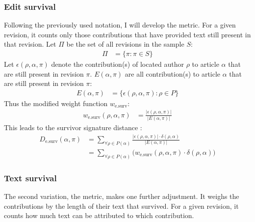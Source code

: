\subsubsection{Edit survival}

Following the previously used notation, I will develop the  metric.
For a given revision, it counts only those contributions that have provided text still present in that revision.
Let $\Pi$ be the set of all revisions in the sample $S$:
\begin{align*}
\Pi &= \{\pi : \pi \in S\}
\end{align*}
Let $\epsilon(\rho,\alpha,\pi)$ denote the contribution(s) of located author $\rho$ to article $\alpha$ that are still present in revision $\pi$.
$E(\alpha,\pi)$ are all contribution(s) to article $\alpha$ that are still present in revision $\pi$:
\begin{align*}
E(\alpha,\pi) &= \{\epsilon(\rho,\alpha,\pi) : \rho \in P\}
\end{align*}
Thus the modified weight function $w_{\text{e.surv}}$: 
\begin{align*}
w_{\text{e.surv}}(\rho,\alpha,\pi) &= \frac{|\epsilon(\rho,\alpha,\pi)|}{|E(\alpha,\pi)|}
\end{align*}
This leads to the survivor signature distance :
\begin{equation}\label{eqn:sigdistsurvival}
\begin{split}
D_{\text{e.surv}}(\alpha,\pi) & = \sum_{\forall \rho \in P(\alpha)} \frac{|\epsilon(\rho,\alpha,\pi)| \cdot \delta(\rho,\alpha)}{|E(\alpha,\pi)|} \\
 & =  \sum_{\forall \rho \in P(\alpha)} \big(w_{\text{e.surv}}(\rho,\alpha,\pi) \cdot \delta(\rho,\alpha)\big)
 \end{split}
\end{equation}
 

\subsubsection{Text survival}

The second variation, the  metric, makes one further adjustment.
It weighs the contributions by the length of their text that survived.
For a given revision, it counts how much text can be attributed to which contribution.


